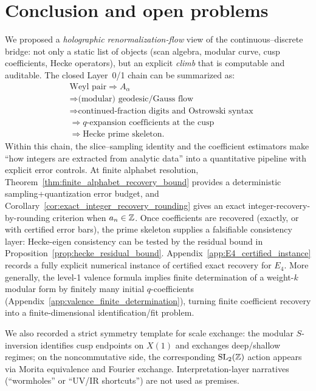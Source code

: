 
\section{Conclusion and open problems}
\label{sec:conclusion}

We proposed a \emph{holographic renormalization-flow} view of the continuous--discrete bridge: not only a static list of objects (scan algebra, modular curve, cusp coefficients, Hecke operators), but an explicit \emph{climb} that is computable and auditable. The closed Layer~0/1 chain can be summarized as:
\begin{equation}
\begin{aligned}
&\text{Weyl pair}\Rightarrow A_\alpha
\\
&\Rightarrow \text{(modular) geodesic/Gauss flow}
\\
&\Rightarrow \text{continued-fraction digits and Ostrowski syntax}
\\
&\Rightarrow q\text{-expansion coefficients at the cusp}
\\
&\Rightarrow \text{Hecke prime skeleton}.
\end{aligned}
\end{equation}
Within this chain, the slice--sampling identity and the coefficient estimators make ``how integers are extracted from analytic data'' into a quantitative pipeline with explicit error controls.
At finite alphabet resolution, Theorem~\ref{thm:finite_alphabet_recovery_bound} provides a deterministic sampling+quantization error budget, and Corollary~\ref{cor:exact_integer_recovery_rounding} gives an exact integer-recovery-by-rounding criterion when $a_n\in\mathbb{Z}$.
Once coefficients are recovered (exactly, or with certified error bars), the prime skeleton supplies a falsifiable consistency layer: Hecke-eigen consistency can be tested by the residual bound in Proposition~\ref{prop:hecke_residual_bound}.
Appendix~\ref{app:E4_certified_instance} records a fully explicit numerical instance of certified exact recovery for $E_4$.
More generally, the level-1 valence formula implies finite determination of a weight-$k$ modular form by finitely many initial $q$-coefficients (Appendix~\ref{app:valence_finite_determination}), turning finite coefficient recovery into a finite-dimensional identification/fit problem.

We also recorded a strict symmetry template for scale exchange: the modular $S$-inversion identifies cusp endpoints on $X(1)$ and exchanges deep/shallow regimes; on the noncommutative side, the corresponding $\mathrm{SL}_2(\mathbb{Z})$ action appears via Morita equivalence and Fourier exchange. Interpretation-layer narratives (``wormholes'' or ``UV/IR shortcuts'') are not used as premises.

